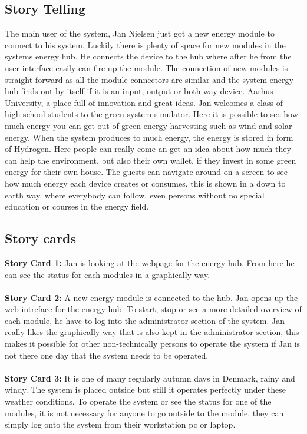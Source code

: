 \subsection{Story Telling}
The main user of the system, Jan Nielsen just got a new energy module to connect to his system. Luckily there is plenty of space
for new modules in the systems energy hub. He connects the device to the hub where after he from the user interface easily can fire up the module.
The connection of new modules is straight forward as all the module connectors are similar and the system energy hub finds out by itself
if it is an input, output or both way device.
\newline
Aarhus University, a place full of innovation and great ideas. Jan welcomes a class of high-school students to the green system simulator. Here it
is possible to see how much energy you can get out of green energy harvesting
such as wind and solar energy. When the system produces to much energy, the 
energy is stored in form of Hydrogen. Here people can really come an get an idea about 
how much they can help the environment, but also their own wallet, if they invest in some green energy for their own house.
The guests can navigate around on a screen to see how much energy each device 
creates or consumes, this is shown in a down to earth way, where everybody can follow, 
even persons without no special education or courses in the energy field.
\subsection{Story cards}
\textbf{Story Card 1:} Jan is looking at the webpage for the energy hub. From here he can see the status for each modules 
in a graphically way.\\\\
\textbf{Story Card 2:} A new energy module is connected to the hub. Jan opens up the web intreface for the energy hub. 
To start, stop or see a more detailed overview of each module, he have to log into the administrator section of the system.
Jan really likes the graphically way that is also kept in the administrator section, this makes it possible for other
non-technically persons to operate the system if Jan is not there one day that the system needs to be operated.\\\\
\textbf{Story Card 3:} It is one of many regularly autumn days in Denmark, rainy and windy. The system is placed outside
but still it operates perfectly under these weather conditions. To operate the system or see the status for one of the modules,
it is not necessary for anyone to go outside to the module, they can simply log onto the system from their workstation pc or laptop.
\newpage
